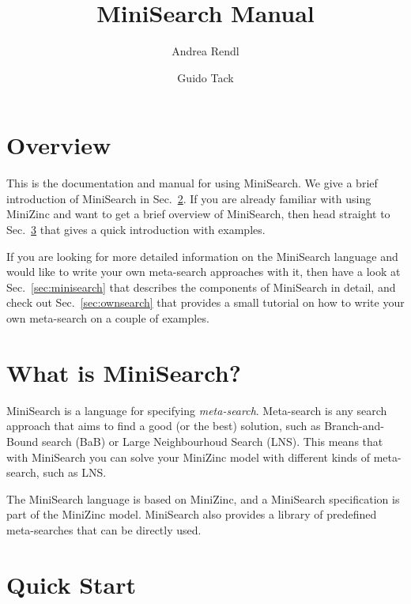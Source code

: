 \documentclass[a4paper,13pt,onecolumn]{article}%
\begin{document}
\title{MiniSearch Manual}
\author{Andrea Rendl \and Guido Tack}

\maketitle

\tableofcontents

\section{Overview}
This is the documentation and manual for using MiniSearch. We give
a brief introduction of MiniSearch in Sec.~\ref{sec:intro}.
If you are already familiar with using MiniZinc and want to get a brief
overview of MiniSearch, then head straight to Sec.~\ref{sec:quickStart}
that gives a quick introduction with examples. 

If you are looking for more detailed information on the MiniSearch
language and would like to write your own meta-search approaches with
it, then have a look at Sec.~\ref{sec:minisearch} that describes the 
components of MiniSearch in detail, and check out Sec.~\ref{sec:ownsearch}
that provides a small tutorial on how to write your own meta-search
on a couple of examples.

\section{What is MiniSearch?}
\label{sec:intro}
MiniSearch is a language for specifying {\em meta-search}. Meta-search is any
search approach that aims to find a good (or the best) solution,
such as Branch-and-Bound search (BaB) or Large Neighbourhoud 
Search (LNS). This means that with MiniSearch you can solve your 
MiniZinc model with different kinds of meta-search, such as LNS.

The MiniSearch language is based on MiniZinc, and a MiniSearch
specification is part of the MiniZinc model. MiniSearch also provides
a library of predefined meta-searches that can be directly used.

\section{Quick Start}
\label{sec:quickStart}
\end{document}

